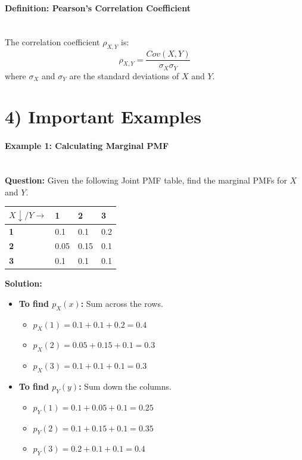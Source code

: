 \documentclass[11pt]{article}
\begin{document}
\vspace{0.1 cm}

\paragraph{Definition: Pearson’s Correlation Coefficient} \leavevmode \\
The correlation coefficient $\rho_{X,Y}$ is:
\[ \rho_{X,Y} = \frac{Cov(X,Y)}{\sigma_X \sigma_Y} \]
where $\sigma_X$ and $\sigma_Y$ are the standard deviations of $X$ and $Y$.

\vspace{0.3cm}

\section*{4) Important Examples}

\paragraph{Example 1: Calculating Marginal PMF} \leavevmode \\
\textbf{Question:} Given the following Joint PMF table, find the marginal PMFs for $X$ and $Y$.
\begin{table}[h!]
\centering
\begin{tabular}{@{}llll@{}}
\toprule
$X \downarrow / Y \rightarrow$ & 1 & 2 & 3 \\ \midrule
\textbf{1} & 0.1 & 0.1 & 0.2 \\
\textbf{2} & 0.05 & 0.15 & 0.1 \\
\textbf{3} & 0.1 & 0.1 & 0.1 \\ \bottomrule
\end{tabular}
\end{table}

\textbf{Solution:}
\begin{itemize}
    \item \textbf{To find $p_X(x)$:} Sum across the rows.
    \begin{itemize}
        \item $p_X(1) = 0.1 + 0.1 + 0.2 = 0.4$
        \item $p_X(2) = 0.05 + 0.15 + 0.1 = 0.3$
        \item $p_X(3) = 0.1 + 0.1 + 0.1 = 0.3$
    \end{itemize}
    \item \textbf{To find $p_Y(y)$:} Sum down the columns.
    \begin{itemize}
        \item $p_Y(1) = 0.1 + 0.05 + 0.1 = 0.25$
        \item $p_Y(2) = 0.1 + 0.15 + 0.1 = 0.35$
        \item $p_Y(3) = 0.2 + 0.1 + 0.1 = 0.4$
    \end{itemize}
\end{itemize}
\end{document}
